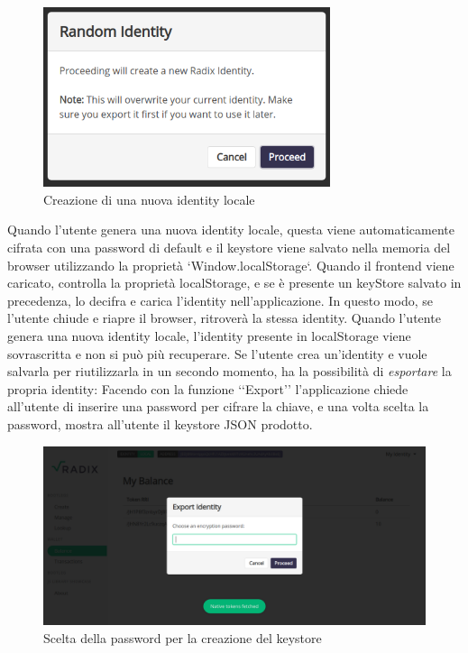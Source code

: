 \begin{figure}[H]
  \centering
  \includegraphics[width=0.75\textwidth]{images/application/create_random.png}
  \caption{Creazione di una nuova identity locale}
  \label{fig:identity_creation}
\end{figure}

Quando l'utente genera una nuova identity locale, questa viene automaticamente cifrata con una password di default e il keystore viene salvato nella memoria del browser utilizzando la proprietà `Window.localStorage`. Quando il frontend viene caricato, controlla la proprietà localStorage, e se è presente un keyStore salvato in precedenza, lo decifra e carica l'identity nell'applicazione. In questo modo, se l'utente chiude e riapre il browser, ritroverà la stessa identity. Quando l'utente genera una nuova identity locale, l'identity presente in localStorage viene sovrascritta e non si può più recuperare. Se l'utente crea un'identity e vuole salvarla per riutilizzarla in un secondo momento, ha la possibilità di \textit{esportare} la propria identity: Facendo con la funzione ‘‘Export’’ l'applicazione chiede all'utente di inserire una password per cifrare la chiave, e una volta scelta la password, mostra all'utente il keystore JSON prodotto. 

\begin{figure}[H]
    \includegraphics[width=\linewidth]{images/application/choose-password.png}
    \caption{Scelta della password per la creazione del keystore}
    \label{fig:choose_password}
\end{figure}

